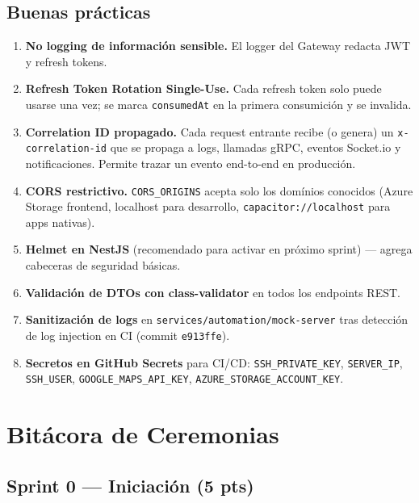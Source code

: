 \documentclass[12pt,a4paper,oneside]{article}
\begin{document}
\subsection{Buenas pr\'acticas}

\begin{enumerate}[leftmargin=*]
  \item \textbf{No logging de informaci\'on sensible.} El logger del Gateway redacta JWT y refresh tokens.
  \item \textbf{Refresh Token Rotation Single-Use.} Cada refresh token solo puede usarse una vez; se marca \texttt{consumedAt} en la primera consumici\'on y se invalida.
  \item \textbf{Correlation ID propagado.} Cada request entrante recibe (o genera) un \texttt{x-correlation-id} que se propaga a logs, llamadas gRPC, eventos Socket.io y notificaciones. Permite trazar un evento end-to-end en producci\'on.
  \item \textbf{CORS restrictivo.} \texttt{CORS\_ORIGINS} acepta solo los dom\'inios conocidos (Azure Storage frontend, localhost para desarrollo, \texttt{capacitor://localhost} para apps nativas).
  \item \textbf{Helmet en NestJS} (recomendado para activar en pr\'oximo sprint) --- agrega cabeceras de seguridad b\'asicas.
  \item \textbf{Validaci\'on de DTOs con class-validator} en todos los endpoints REST.
  \item \textbf{Sanitizaci\'on de logs} en \texttt{services/automation/mock-server} tras detecci\'on de log injection en CI (commit \texttt{e913ffe}).
  \item \textbf{Secretos en GitHub Secrets} para CI/CD: \texttt{SSH\_PRIVATE\_KEY}, \texttt{SERVER\_IP}, \texttt{SSH\_USER}, \texttt{GOOGLE\_MAPS\_API\_KEY}, \texttt{AZURE\_STORAGE\_ACCOUNT\_KEY}.
\end{enumerate}

\section{Bit\'acora de Ceremonias}

\subsection{Sprint 0 --- Iniciaci\'on (5 pts)}
\end{document}
